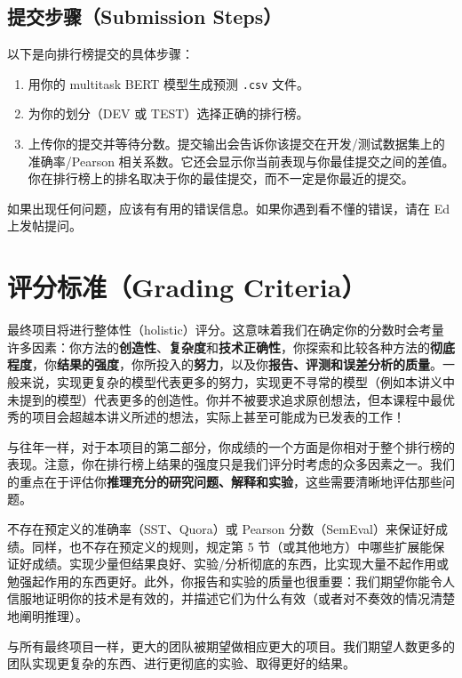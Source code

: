 \documentclass[11pt]{article}
\begin{document}
\subsection{提交步骤（Submission Steps）}

以下是向排行榜提交的具体步骤：

\begin{enumerate}
  \item 用你的 multitask BERT 模型生成预测 \texttt{.csv} 文件。
  \item 为你的划分（DEV 或 TEST）选择正确的排行榜。
  \item 上传你的提交并等待分数。提交输出会告诉你该提交在开发/测试数据集上的准确率/Pearson 相关系数。它还会显示你当前表现与你最佳提交之间的差值。你在排行榜上的排名取决于你的最佳提交，而不一定是你最近的提交。
\end{enumerate}

如果出现任何问题，应该有有用的错误信息。如果你遇到看不懂的错误，请在 Ed 上发帖提问。

\section{评分标准（Grading Criteria）}

最终项目将进行整体性（holistic）评分。这意味着我们在确定你的分数时会考量许多因素：你方法的\textbf{创造性}、\textbf{复杂度}和\textbf{技术正确性}，你探索和比较各种方法的\textbf{彻底程度}，你\textbf{结果的强度}，你所投入的\textbf{努力}，以及你\textbf{报告、评测和误差分析的质量}。一般来说，实现更复杂的模型代表更多的努力，实现更不寻常的模型（例如本讲义中未提到的模型）代表更多的创造性。你并不被要求追求原创想法，但本课程中最优秀的项目会超越本讲义所述的想法，实际上甚至可能成为已发表的工作！

与往年一样，对于本项目的第二部分，你成绩的一个方面是你相对于整个排行榜的表现。注意，你在排行榜上结果的强度只是我们评分时考虑的众多因素之一。我们的重点在于评估你\textbf{推理充分的研究问题、解释和实验}，这些需要清晰地评估那些问题。

不存在预定义的准确率（SST、Quora）或 Pearson 分数（SemEval）来保证好成绩。同样，也不存在预定义的规则，规定第 5 节（或其他地方）中哪些扩展能保证好成绩。实现少量但结果良好、实验/分析彻底的东西，比实现大量不起作用或勉强起作用的东西更好。此外，你报告和实验的质量也很重要：我们期望你能令人信服地证明你的技术是有效的，并描述它们为什么有效（或者对不奏效的情况清楚地阐明推理）。

与所有最终项目一样，更大的团队被期望做相应更大的项目。我们期望人数更多的团队实现更复杂的东西、进行更彻底的实验、取得更好的结果。
\end{document}
